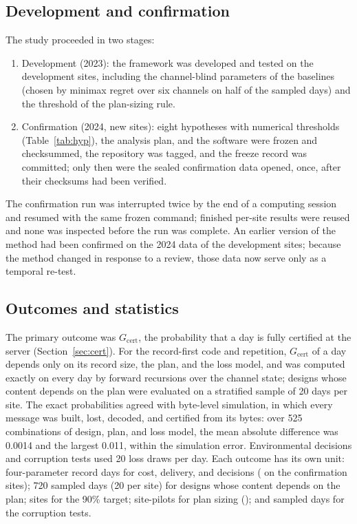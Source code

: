 \subsection{Development and confirmation}
\label{sec:procedure}
The study proceeded in two stages:
\begin{enumerate}
  \item Development (2023): the framework was developed and tested on the development sites, including the channel-blind parameters of the baselines (chosen by minimax regret over six channels on half of the sampled days) and the threshold of the plan-sizing rule.
  \item Confirmation (2024, new sites): eight hypotheses with numerical thresholds (Table~\ref{tab:hyp}), the analysis plan, and the software were frozen and checksummed, the repository was tagged, and the freeze record was committed; only then were the sealed confirmation data opened, once, after their checksums had been verified.
\end{enumerate}
The confirmation run was interrupted twice by the end of a computing session and resumed with the same frozen command; finished per-site results were reused and none was inspected before the run was complete. An earlier version of the method had been confirmed on the 2024 data of the development sites; because the method changed in response to a review, those data now serve only as a temporal re-test.

\subsection{Outcomes and statistics}
\label{sec:stats}
The primary outcome was $G_{\mathrm{cert}}$, the probability that a day is fully certified at the server (Section~\ref{sec:cert}). For the record-first code and repetition, $G_{\mathrm{cert}}$ of a day depends only on its record size, the plan, and the loss model, and was computed exactly on every day by forward recursions over the channel state; designs whose content depends on the plan were evaluated on a stratified sample of 20 days per site. The exact probabilities agreed with byte-level simulation, in which every message was built, lost, decoded, and certified from its bytes: over 525 combinations of design, plan, and loss model, the mean absolute difference was 0.0014 and the largest 0.011, within the simulation error. Environmental decisions and corruption tests used 20 loss draws per day. Each outcome has its own unit: four-parameter record days for cost, delivery, and decisions (\nDaysConfFour{} on the confirmation sites); 720 sampled days (20 per site) for designs whose content depends on the plan; sites for the 90\% target; site-pilots for plan sizing (\sizePilotsConf{}); and \nDaysCorrConf{} sampled days for the corruption tests.

